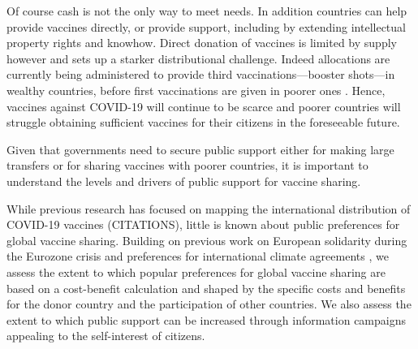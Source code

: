 \documentclass[12pt,oneside,smallheadings,chapterprefix=true]{article}
\begin{document}
Of course cash is not the only way to meet needs. In addition countries can help provide vaccines directly, or provide support, including by extending intellectual property rights and knowhow. Direct donation of vaccines is limited by supply however and sets up a starker distributional challenge. Indeed allocations are currently being administered to provide third vaccinations---booster shots---in wealthy countries, before first vaccinations are given in poorer ones \citep{Mahase2021}. Hence,  vaccines against COVID-19 will continue to be scarce  and poorer countries will struggle obtaining  sufficient vaccines for their citizens in the foreseeable future. 

Given that governments need to secure public support either for making large transfers or for sharing vaccines with poorer countries, it is important to understand the levels and drivers of public support for vaccine sharing. 



While previous research has focused on mapping the international distribution of COVID-19 vaccines (CITATIONS), little is known about public preferences for global vaccine sharing. Building on previous work on European solidarity during the Eurozone crisis \citep{Bechtel2017, Kuhn2018, Kuhn2020, Stoeckel2018} and preferences for international climate agreements \citep{Bechtel2013, Bechtel2017, Bechtel2019},  
we assess the extent to which popular preferences for global vaccine sharing are based on a cost-benefit calculation and shaped by the specific costs and benefits for the donor country and the participation of other countries. We also assess the extent to which public support can be increased through information campaigns appealing to the self-interest of citizens. 
\end{document}
